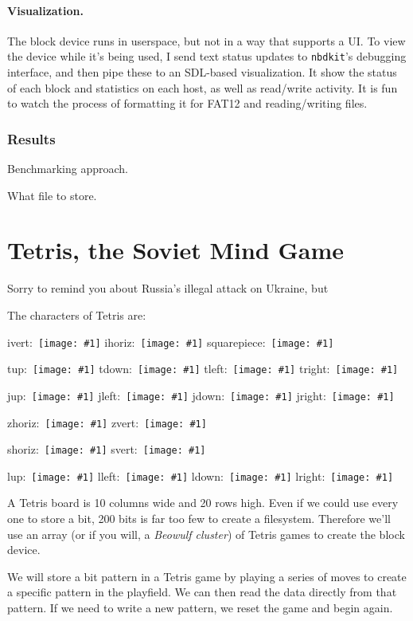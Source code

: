 \documentclass[twocolumn]{article}
\newcommand\tetrispiece[1]{\,\texttt{[image: \#1]}\hspace{0.1em}}
\newcommand\ivert{\tetrispiece{i_vert}}
\newcommand\ihoriz{\tetrispiece{i_horiz}}
\newcommand\squarepiece{\tetrispiece{square}}
\newcommand\tup{\tetrispiece{t_up}}
\newcommand\tdown{\tetrispiece{t_down}}
\newcommand\tleft{\tetrispiece{t_left}}
\newcommand\tright{\tetrispiece{t_right}}
\newcommand\jup{\tetrispiece{j_up}}
\newcommand\jleft{\tetrispiece{j_left}}
\newcommand\jdown{\tetrispiece{j_down}}
\newcommand\jright{\tetrispiece{j_right}}
\newcommand\zhoriz{\tetrispiece{z_horiz}}
\newcommand\zvert{\tetrispiece{z_vert}}
\newcommand\shoriz{\tetrispiece{s_horiz}}
\newcommand\svert{\tetrispiece{s_vert}}
\newcommand\lup{\tetrispiece{l_up}}
\newcommand\lleft{\tetrispiece{l_left}}
\newcommand\ldown{\tetrispiece{l_down}}
\newcommand\lright{\tetrispiece{l_right}}
\begin{document}
\paragraph{Visualization.} The block device runs in userspace,
but not in a way that supports a UI. To view the device while it's
being used, I send text status updates to {\tt nbdkit}'s debugging
interface, and then pipe these to an SDL-based visualization. It show
the status of each block and statistics on each host, as well as
read/write activity. It is fun to watch the process of formatting
it for FAT12 and reading/writing files.

\subsubsection{Results}

Benchmarking approach.

What file to store.



\section{Tetris, the Soviet Mind Game} \label{sec:tetru}

Sorry to remind you about Russia's illegal attack on Ukraine, but

The characters of Tetris are:

ivert: \ivert
ihoriz: \ihoriz
squarepiece: \squarepiece

tup: \tup
tdown: \tdown
tleft: \tleft
tright: \tright

jup: \jup
jleft: \jleft
jdown: \jdown
jright: \jright

zhoriz: \zhoriz
zvert: \zvert

shoriz: \shoriz
svert: \svert

lup: \lup
lleft: \lleft
ldown: \ldown
lright: \lright


A Tetris board is 10 columns wide and 20 rows high. Even if we could
use every one to store a bit, 200 bits is far too few to create a
filesystem. Therefore we'll use an array (or if you will, a {\em
  Beowulf cluster}) of Tetris games to create the block device.

We will store a bit pattern in a Tetris game by playing a series of
moves to create a specific pattern in the playfield. We can then read
the data directly from that pattern. If we need to write a new
pattern, we reset the game and begin again.
\end{document}
